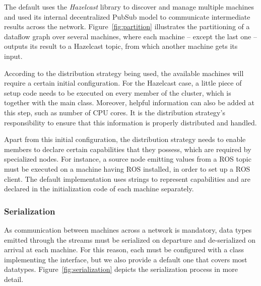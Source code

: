 \documentclass[sigplan,screen,10pt]{acmart}
\begin{document}
The default  uses the \textit{Hazelcast}
library to discover and manage multiple machines and used its internal decentralized PubSub model
to communicate intermediate results across the network. Figure~\ref{fig:partition}
illustrates the partitioning of a dataflow graph over several machines, where each
machine -- except the last one -- outputs its result to a Hazelcast topic,
from which another machine gets its input.
%

According to the distribution strategy being used, the available machines will
require a certain initial configuration. For the Hazelcast case, a
little piece of setup code needs to be executed on every member of the cluster,
which is together with the main  class. Moreover, helpful
information can also be added at this step, such as number of CPU cores. It is
the distribution strategy's responsibility to ensure that this information is
properly distributed and handled.

Apart from this initial configuration, the distribution strategy needs to enable
members to declare certain capabilities that they possess, which are required by
specialized nodes. For instance, a source node emitting values from a ROS topic
must be executed on a machine having ROS installed, in order to set up a ROS
client. The default implementation uses strings to represent capabilities and
are declared in the initialization code of each machine separately.

\subsubsection{Serialization}
As communication between machines across a network is mandatory, data types
emitted through the streams must be serialized on departure and de-serialized on
arrival at each machine. For this reason, each 
must be configured with a class implementing the  interface,
but we also provide a default one that covers most datatypes.
Figure~\ref{fig:serialization} depicts the serialization process in more detail.
\end{document}
